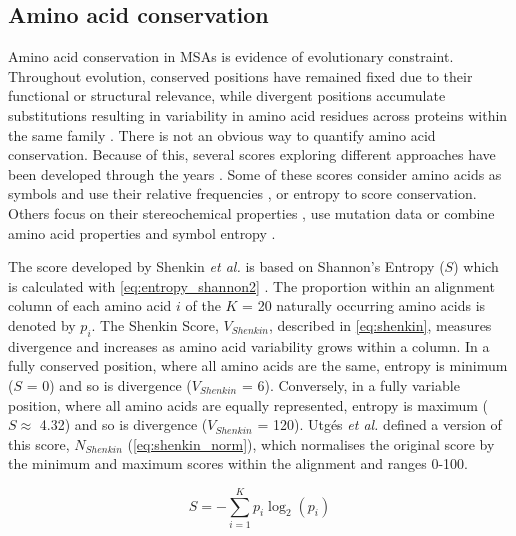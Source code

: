 \subsection{Amino acid conservation}

Amino acid conservation in MSAs is evidence of evolutionary constraint. Throughout evolution, conserved positions have remained fixed due to their functional or structural relevance, while divergent positions accumulate substitutions resulting in variability in amino acid residues across proteins within the same family \cite{ZUCKERKANDL_1965_DIVERGENCE}. There is not an obvious way to quantify amino acid conservation. Because of this, several scores exploring different approaches have been developed through the years \cite{VALDAR_2002_SCORES}. Some of these scores consider amino acids as symbols and use their relative frequencies \cite{WU_1970_SCORE, JORES_1990_SCORE, LOCKLESS_1999_SCORE}, or entropy \cite{SANDER_1991_SCORE, SHENKIN_1991_SCORE, GERSTEIN_1995_SCORE} to score conservation. Others focus on their stereochemical properties \cite{TAYLOR_1986_PROPERTIES, ZVELEBIL_1987_PREDICTION}, use mutation data \cite{KARLIN_1996_SCORE, THOMPSON_1997_SCORE, LANDGRAF_1999_SCORE, PILPEL_1999_SCORE, ARMON_2001_SCORE, VALDAR_2001_SCORE} or combine amino acid properties and symbol entropy \cite{WILLIAMSON_1995_SCORE, MIRNY_1999_SCORE}.

The score developed by Shenkin \textit{et al.} \cite{SHENKIN_1991_SCORE} is based on Shannon's Entropy ($S$) which is calculated with \autoref{eq:entropy_shannon2} \cite{SHANNON_1948_ENTROPY}. The proportion within an alignment column of each amino acid $i$ of the $K$ = 20 naturally occurring amino acids is denoted by $p_i$. The Shenkin Score, $V_{Shenkin}$, described in \autoref{eq:shenkin}, measures divergence and increases as amino acid variability grows within a column. In a fully conserved position, where all amino acids are the same, entropy is minimum ($S$ = 0) and so is divergence ($V_{Shenkin}$ = 6). Conversely, in a fully variable position, where all amino acids are equally represented, entropy is maximum ($S \approx$ 4.32) and so is divergence ($V_{Shenkin}$ = 120). Utgés \textit{et al.} \cite{UTGES_2021_ANKS} defined a version of this score, $N_{Shenkin}$ (\autoref{eq:shenkin_norm}), which normalises the original score by the minimum and maximum scores within the alignment and ranges 0-100.

\begin{equation}
S = - \sum_{i=1}^{K} p_i \log_2(p_i)
\label{eq:entropy_shannon2}
\end{equation}

